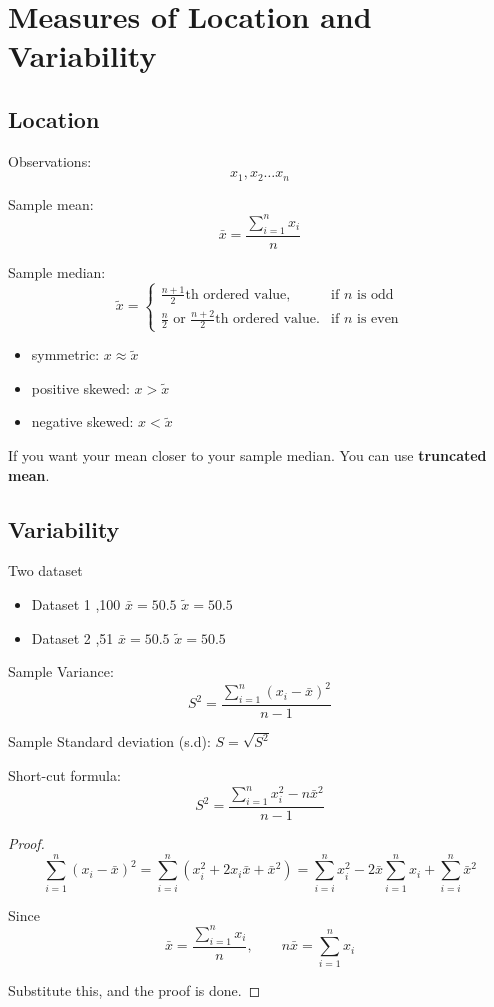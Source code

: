 \section{Measures of Location and Variability}
\subsection{Location}

Observations: \[x_1,x_2 \dots x_n\]

Sample mean:
\[\bar{x}=\frac{\sum_{i=1}^{n} x_i}{n}\]

Sample median:
\[	\tilde{x}=\begin{cases}
\frac{n+1}{2}\text{th ordered value}, &\text{if } n \text{ is odd}\\
\frac{n}{2}\text{ or }\frac{n+2}{2}\text{th ordered value}. &\text{if }n\text{ is even}
\end{cases}	\]


\begin{itemize}
  \item symmetric: $x\approx \tilde{x}$
  \item positive skewed: $x>\tilde{x}$
  \item negative skewed: $x<\tilde{x}$
\end{itemize}

If you want your mean closer to your sample median. You can use \textbf{truncated mean}.

\subsection{Variability}
\begin{exmp}
Two dataset
  \begin{itemize}
    \item Dataset 1 ,100 \qquad  $\bar{x}=50.5$ \qquad $\tilde{x}=50.5$
    \item Dataset 2 ,51 \qquad  $\bar{x}=50.5$ \qquad $\tilde{x}=50.5$
  \end{itemize}
\end{exmp}

Sample Variance: \[S^2=\frac{\sum_{i=1}^{n} (x_i-\bar{x})^2}{n-1}\]

Sample Standard deviation (s.d): $S=\sqrt{S^2}$

Short-cut formula:
\[S^2=\frac{{\sum_{i=1}^{n} x_i^2} - n{\bar{x}}^2}{n-1}
\]
\begin{proof}
\[\sum_{i=1}^{n}(x_i-\bar{x})^2=
\sum_{i=i}^{n}(x_i^2+2x_i\bar{x}+{\bar{x}}^2)=
\sum_{i=i}^{n}x_i^2-2\bar{x}\sum_{i=1}^{n}x_i+
\sum_{i=i}^{n}\bar{x}^2 \]

Since 
\[\bar{x}=\frac{\sum_{i=1}^{n} x_i}{n}, \qquad n\bar{x}=\sum_{i=1}^{n} x_i \]

Substitute this, and the proof is done. 
\end{proof}


